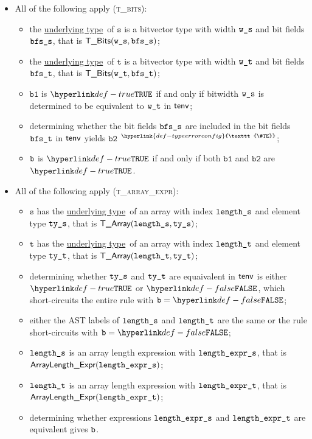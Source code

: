 \documentclass{book}
\newcommand\TypeErrorConfig[0]{\hyperlink{def-typeerrorconfig}{\texttt{\#TE}}}
\newcommand\ProseOrTypeError[0]{\hyperlink{def-proseortypeerror}{$^{\TypeErrorConfig}$}}
\newcommand\underlyingtype[0]{\hyperlink{def-underlyingtype}{underlying type}}
\newcommand\vt[0]{\texttt{t}}
\newcommand\vs[0]{\texttt{s}}
\newcommand\vbone[0]{\texttt{b1}}
\newcommand\vbtwo[0]{\texttt{b2}}
\begin{document}
\begin{itemize}
\item All of the following apply (\textsc{t\_bits}):
  \begin{itemize}
  \item the \underlyingtype\ of $\vs$ is a bitvector type with width $\texttt{w\_s}$ and bit fields $\texttt{bfs\_s}$, that is $\textsf{T\_Bits}(\texttt{w\_s}, \texttt{bfs\_s})$;
  \item the \underlyingtype\ of $\vt$ is a bitvector type with width $\texttt{w\_t}$ and bit fields $\texttt{bfs\_t}$, that is $\textsf{T\_Bits}(\texttt{w\_t}, \texttt{bfs\_t})$;
  \item $\vbone$ is $\True$ if and only if bitwidth $\texttt{w\_s}$ is determined to be equivalent to $\texttt{w\_t}$ in $\textsf{tenv}$;
  \item determining whether the bit fields $\texttt{bfs\_s}$ are included in the bit fields $\texttt{bfs\_t}$ in $\textsf{tenv}$ yields $\vbtwo$ \ProseOrTypeError;
  \item $\texttt{b}$ is $\True$ if and only if both $\vbone$ and $\vbtwo$ are $\True$.
  \end{itemize}

\item All of the following apply (\textsc{t\_array\_expr}):
  \begin{itemize}
  \item $\vs$ has the \underlyingtype\ of an array with index $\texttt{length\_s}$ and element type $\texttt{ty\_s}$, that is $\textsf{T\_Array}(\texttt{length\_s}, \texttt{ty\_s})$;
  \item $\vt$ has the \underlyingtype\ of an array with index $\texttt{length\_t}$ and element type $\texttt{ty\_t}$, that is $\textsf{T\_Array}(\texttt{length\_t}, \texttt{ty\_t})$;
  \item determining whether $\texttt{ty\_s}$ and $\texttt{ty\_t}$ are equaivalent in $\textsf{tenv}$ is either $\True$
  or $\False$, which short-circuits the entire rule with $\vb=\False$;
  \item either the AST labels of $\texttt{length\_s}$ and $\texttt{length\_t}$ are the same or the rule short-circuits with $\vb=\False$;
  \item $\texttt{length\_s}$ is an array length expression with $\texttt{length\_expr\_s}$, that is \\ $\textsf{ArrayLength\_Expr}(\texttt{length\_expr\_s})$;
  \item $\texttt{length\_t}$ is an array length expression with $\texttt{length\_expr\_t}$, that is \\ $\textsf{ArrayLength\_Expr}(\texttt{length\_expr\_t})$;
  \item determining whether expressions $\texttt{length\_expr\_s}$ and $\texttt{length\_expr\_t}$ are equivalent gives $\texttt{b}$.
  \end{itemize}


\end{itemize}
\end{document}
